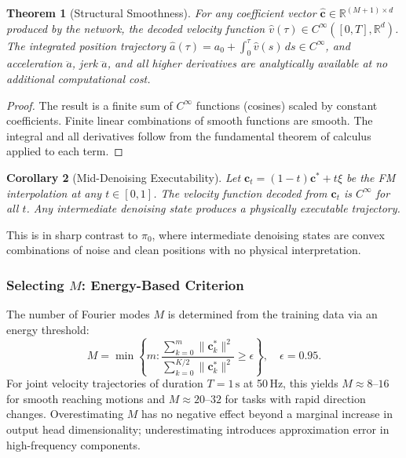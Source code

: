 \documentclass[11pt]{article}
\theoremstyle{plain}
\newtheorem{theorem}{Theorem}[section]
\newtheorem{corollary}[theorem]{Corollary}
\theoremstyle{definition}
\newcommand{\R}{\mathbb{R}}
\newcommand{\tdiff}{t}
\newcommand{\texec}{\tau}
\newcommand{\ccoeff}{\mathbf{c}}
\newcommand{\cclean}{\ccoeff^*}
\newcommand{\cnoisy}{\ccoeff_\tdiff}
\begin{document}
\begin{theorem}[Structural Smoothness]
\label{thm:smooth_fourier}
For any coefficient vector $\hat{\ccoeff} \in \R^{(M+1)\times d}$
produced by the network, the decoded velocity function
$\hat{v}(\texec) \in C^\infty([0,T],\R^d)$.
The integrated position trajectory
$\hat{a}(\texec) = a_0 + \int_0^\texec \hat{v}(s)\,ds \in C^\infty$,
and acceleration $\ddot{a}$, jerk $\dddot{a}$, and all higher derivatives
are analytically available at no additional computational cost.
\end{theorem}

\begin{proof}
The result is a finite sum of $C^\infty$ functions (cosines) scaled by
constant coefficients.
Finite linear combinations of smooth functions are smooth.
The integral and all derivatives follow from the fundamental theorem of
calculus applied to each term.
\end{proof}

\begin{corollary}[Mid-Denoising Executability]
\label{cor:middenoise}
Let $\cnoisy = (1-\tdiff)\cclean + \tdiff\xi$ be the FM interpolation
at any $\tdiff \in [0,1]$.
The velocity function decoded from $\cnoisy$ is $C^\infty$ for all $\tdiff$.
Any intermediate denoising state produces a physically executable trajectory.
\end{corollary}

This is in sharp contrast to $\pi_0$, where intermediate denoising states
are convex combinations of noise and clean positions with no physical
interpretation.

\subsubsection{Selecting $M$: Energy-Based Criterion}

The number of Fourier modes $M$ is determined from the training data
via an energy threshold:
\begin{equation}
  M = \min\!\left\{m : \frac{\sum_{k=0}^{m} \|\cclean_k\|^2}
    {\sum_{k=0}^{K/2} \|\cclean_k\|^2} \geq \epsilon\right\},
  \quad \epsilon = 0.95.
\end{equation}
For joint velocity trajectories of duration $T=1\,\text{s}$ at 50\,Hz,
this yields $M \approx 8$--$16$ for smooth reaching motions and
$M \approx 20$--$32$ for tasks with rapid direction changes.
Overestimating $M$ has no negative effect beyond a marginal increase in
output head dimensionality; underestimating introduces approximation error
in high-frequency components.
\end{document}
